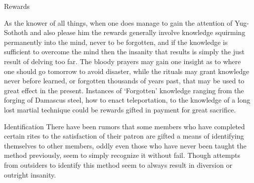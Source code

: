 \documentclass[blue]{guildcamp4}
\begin{document}
Rewards

As the knower of all things, when one does manage to gain the attention of Yug-Sothoth and also please him the rewards generally involve knowledge squirming permanently into the mind, never to be forgotten, and if the knowledge is sufficient to overcome the mind then the insanity that results is simply the just result of delving too far.  The bloody prayers may gain one insight as to where one should go tomorrow to avoid disaster, while the rituals may grant knowledge never before learned, or forgotten thousands of years past, that may be used to great effect in the present.  Instances of ‘Forgotten’ knowledge ranging from the forging of Damascus steel, how to enact teleportation, to the knowledge of a long lost martial technique could be rewards gifted in payment for great sacrifice.

Identification
There have been rumors that some members who have completed certain rites to the satisfaction of their patron are gifted a means of identifying themselves to other members, oddly even those who have never been taught the method previously, seem to simply recognize it without fail. Though attempts from outsiders to identify this method seem to always result in diversion or outright insanity.  










%
\end{document}
